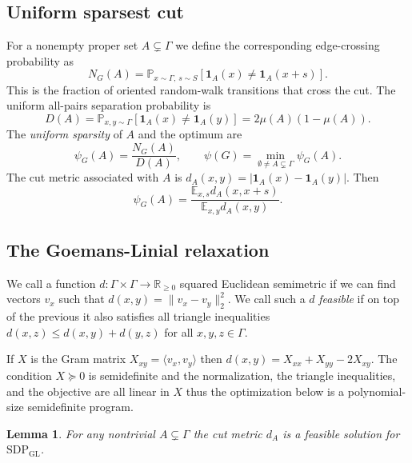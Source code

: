 \documentclass[11pt]{article}
\newtheorem{lemma}[theorem]{Lemma}
\theoremstyle{definition}
\theoremstyle{remark}
\newcommand{\E}{\mathbb{E}}
\newcommand{\Prb}{\mathbb{P}}
\newcommand{\R}{\mathbb{R}}
\newcommand{\one}{\mathbf{1}}
\newcommand{\gl}{\operatorname{SDP_{GL}}}
\begin{document}
\subsection{Uniform sparsest cut}
For a nonempty proper set $A\subsetneq\Gamma$ we define the corresponding edge-crossing probability as
\begin{equation}\label{eq:cut-numerator}
  N_G(A)=\Prb_{x\sim\Gamma,\,s\sim S}
  [\one_A(x)\ne\one_A(x+s)].
\end{equation}
This is the fraction of oriented random-walk transitions that cross the cut. The uniform all-pairs separation probability is
\begin{equation}\label{eq:cut-denominator}
  D(A)=\Prb_{x,y\sim\Gamma}[\one_A(x)\ne\one_A(y)]
  =2\mu(A)(1-\mu(A)).
\end{equation}
The \emph{uniform sparsity} of $A$ and the optimum are
\begin{equation}\label{eq:psi-def}
  \psi_G(A)=\frac{N_G(A)}{D(A)},
  \qquad
  \psi(G)=\min_{\emptyset\ne A\subsetneq\Gamma}\psi_G(A).
\end{equation}
The cut metric associated with $A$ is $d_A(x,y)=|\one_A(x)-\one_A(y)|$. Then
\begin{equation}\label{eq:cut-metric-ratio}
  \psi_G(A)
  =\frac{\E_{x,s}d_A(x,x+s)}{\E_{x,y}d_A(x,y)}.
\end{equation}



\subsection{The Goemans-Linial relaxation}
We call a function $d:\Gamma\times\Gamma\to\R_{\geq 0}$ squared Euclidean semimetric if we can find vectors $v_x$  such that $d(x,y)=\|v_x-v_y\|_2^2$.
We call such a $d$ \emph{feasible} if on top of the previous it also satisfies all triangle inequalities $d(x,z)\leq d(x,y)+d(y,z)$ for all $x,y,z\in\Gamma$.


If $X$ is the Gram matrix $X_{xy}=\langle v_x,v_y\rangle$ then $d(x,y)=X_{xx}+X_{yy}-2X_{xy}$.
The condition $X\succeq0$ is semidefinite and the normalization, the triangle inequalities, and the objective are all linear in $X$ thus the optimization below is a polynomial-size semidefinite program.


\begin{lemma}\label{lem:cut-feasible}
For any nontrivial $A\subsetneq\Gamma$ the cut metric $d_A$ is a feasible solution for $\gl$.
\end{lemma}
\end{document}
